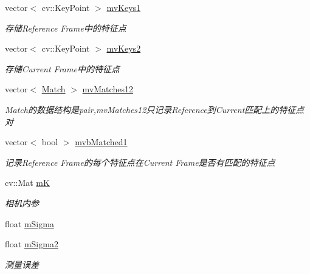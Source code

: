 \begin{DoxyCompactItemize}
\item 
vector$<$ cv\+::\+Key\+Point $>$ \mbox{\hyperlink{class_o_r_b___s_l_a_m2_1_1_initializer_aa4a8bce28d125446b4607f12041c7c13}{mv\+Keys1}}
\begin{DoxyCompactList}\small\item\em 存储\+Reference Frame中的特征点 \end{DoxyCompactList}\item 
vector$<$ cv\+::\+Key\+Point $>$ \mbox{\hyperlink{class_o_r_b___s_l_a_m2_1_1_initializer_a034e9d495b47667f3e0bf0bc3190ff05}{mv\+Keys2}}
\begin{DoxyCompactList}\small\item\em 存储\+Current Frame中的特征点 \end{DoxyCompactList}\item 
vector$<$ \mbox{\hyperlink{class_o_r_b___s_l_a_m2_1_1_initializer_ad0bf21297bc6271e7d014ce41d6ff7d4}{Match}} $>$ \mbox{\hyperlink{class_o_r_b___s_l_a_m2_1_1_initializer_ac4ef04be7036e4629a8b3fa05c7327f5}{mv\+Matches12}}
\begin{DoxyCompactList}\small\item\em Match的数据结构是pair,mv\+Matches12只记录\+Reference到\+Current匹配上的特征点对 \end{DoxyCompactList}\item 
vector$<$ bool $>$ \mbox{\hyperlink{class_o_r_b___s_l_a_m2_1_1_initializer_a3a90762e82702f06f6999672ebaa4cb8}{mvb\+Matched1}}
\begin{DoxyCompactList}\small\item\em 记录\+Reference Frame的每个特征点在\+Current Frame是否有匹配的特征点 \end{DoxyCompactList}\item 
cv\+::\+Mat \mbox{\hyperlink{class_o_r_b___s_l_a_m2_1_1_initializer_a557fe4d78becc1dda7a26c71d2254336}{mK}}
\begin{DoxyCompactList}\small\item\em 相机内参 \end{DoxyCompactList}\item 
float \mbox{\hyperlink{class_o_r_b___s_l_a_m2_1_1_initializer_ad588868e84cb1b7e256928dd0d50baee}{m\+Sigma}}
\item 
float \mbox{\hyperlink{class_o_r_b___s_l_a_m2_1_1_initializer_a7af4e0e177bb75879dac174b758ce7d4}{m\+Sigma2}}
\begin{DoxyCompactList}\small\item\em 测量误差 \end{DoxyCompactList}\item 

\end{DoxyCompactItemize}
